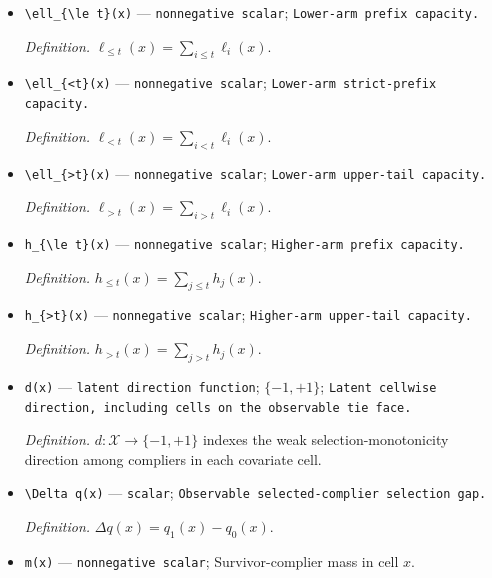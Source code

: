 \documentclass{article}
\begin{document}
\begin{itemize}
  \par\smallskip\noindent\emph{Definition.} \(q_1(x)=\sum_{j=0}^{K-1}h_j(x)\).
  \item \texttt{\textbackslash{}\allowbreak{}ell\_\allowbreak{}\{\textbackslash{}\allowbreak{}le t\}\allowbreak{}(x)} --- \texttt{nonnegative scalar}; \texttt{Lower-\allowbreak{}arm prefix capacity.}
  \par\smallskip\noindent\emph{Definition.} \(\ell_{\le t}(x)=\sum_{i\le t}\ell_i(x)\).
  \item \texttt{\textbackslash{}\allowbreak{}ell\_\allowbreak{}\{<t\}\allowbreak{}(x)} --- \texttt{nonnegative scalar}; \texttt{Lower-\allowbreak{}arm strict-\allowbreak{}prefix capacity.}
  \par\smallskip\noindent\emph{Definition.} \(\ell_{<t}(x)=\sum_{i<t}\ell_i(x)\).
  \item \texttt{\textbackslash{}\allowbreak{}ell\_\allowbreak{}\{>t\}\allowbreak{}(x)} --- \texttt{nonnegative scalar}; \texttt{Lower-\allowbreak{}arm upper-\allowbreak{}tail capacity.}
  \par\smallskip\noindent\emph{Definition.} \(\ell_{>t}(x)=\sum_{i>t}\ell_i(x)\).
  \item \texttt{h\_\allowbreak{}\{\textbackslash{}\allowbreak{}le t\}\allowbreak{}(x)} --- \texttt{nonnegative scalar}; \texttt{Higher-\allowbreak{}arm prefix capacity.}
  \par\smallskip\noindent\emph{Definition.} \(h_{\le t}(x)=\sum_{j\le t}h_j(x)\).
  \item \texttt{h\_\allowbreak{}\{>t\}\allowbreak{}(x)} --- \texttt{nonnegative scalar}; \texttt{Higher-\allowbreak{}arm upper-\allowbreak{}tail capacity.}
  \par\smallskip\noindent\emph{Definition.} \(h_{>t}(x)=\sum_{j>t}h_j(x)\).
  \item \texttt{d(x)} --- \texttt{latent direction function}; \(\{-1,+1\}\); \texttt{Latent cellwise direction,\allowbreak{} including cells on the observable tie face.}
  \par\smallskip\noindent\emph{Definition.} \(d:\mathcal X\to\{-1,+1\}\) indexes the weak selection-monotonicity direction among compliers in each covariate cell.
  \item \texttt{\textbackslash{}\allowbreak{}Delta q(x)} --- \texttt{scalar}; \texttt{Observable selected-\allowbreak{}complier selection gap.}
  \par\smallskip\noindent\emph{Definition.} \(\Delta q(x)=q_1(x)-q_0(x)\).
  \item \texttt{m(x)} --- \texttt{nonnegative scalar}; Survivor-complier mass in cell \(x\).

\end{itemize}
\end{document}
